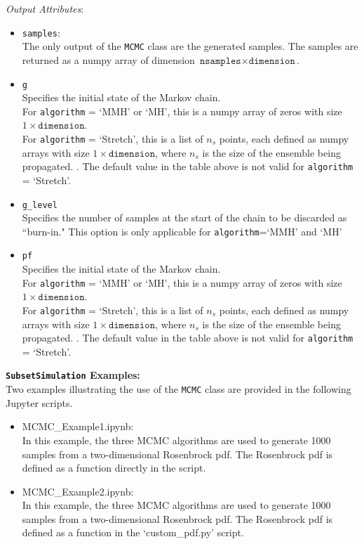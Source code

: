 \documentclass[./UsersGuide.tex]{subfiles}
\begin{document}
\noindent\textit{Output Attributes}:
\begin{itemize}
\item \texttt{samples}:\\
	The only output of the \texttt{MCMC} class are the generated samples. The samples are returned as a numpy array of dimension $\texttt{nsamples}\times\texttt{dimension}$. 
\item \texttt{g}\\
	Specifies the initial state of the Markov chain. \\
	
	For \texttt{algorithm} = `MMH' or `MH', this is a numpy array of zeros with size $1\times \texttt{dimension}$.\\
	
	For \texttt{algorithm} = `Stretch', this is a list of $n_s$ points, each defined as numpy arrays with size $1\times \texttt{dimension}$, where $n_s$ is the size of the ensemble being 		propagated. \cite{Goodman2010}. The default value in the table above is not valid for  \texttt{algorithm} = `Stretch'.
\item \texttt{g\_level}\\
	Specifies the number of samples at the start of the chain to be discarded as ``burn-in." This option is only applicable for \texttt{algorithm}=`MMH' and `MH'
\item \texttt{pf}\\
	Specifies the initial state of the Markov chain. \\
	
	For \texttt{algorithm} = `MMH' or `MH', this is a numpy array of zeros with size $1\times \texttt{dimension}$.\\
	
	For \texttt{algorithm} = `Stretch', this is a list of $n_s$ points, each defined as numpy arrays with size $1\times \texttt{dimension}$, where $n_s$ is the size of the ensemble being 		propagated. \cite{Goodman2010}. The default value in the table above is not valid for  \texttt{algorithm} = `Stretch'.
\end{itemize}

\noindent\textbf{\texttt{SubsetSimulation} Examples:}\\
\noindent Two examples illustrating the use of the \texttt{MCMC} class are provided in the following Jupyter scripts.
\begin{itemize}
\item MCMC\_Example1.ipynb:\\
	In this example, the three MCMC algorithms are used to generate 1000 samples from a two-dimensional Rosenbrock pdf. The Rosenbrock pdf is defined as a function directly in the 	script.
\item MCMC\_Example2.ipynb:\\
	In this example, the three MCMC algorithms are used to generate 1000 samples from a two-dimensional Rosenbrock pdf. The Rosenbrock pdf is defined as a function in the 			`custom\_pdf.py' script.
\end{itemize}
\end{document}
